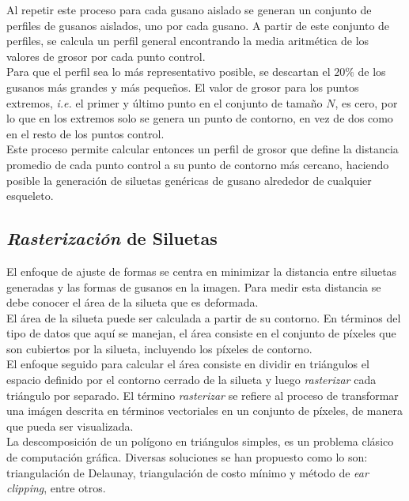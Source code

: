 Al repetir este proceso para cada gusano aislado se generan un conjunto de perfiles de gusanos
aislados, uno por cada gusano. A partir de este conjunto de perfiles, se calcula un perfil
general encontrando la media aritm\'etica de los valores de grosor por cada punto control.\\
Para que el perfil sea lo m\'as representativo posible, se descartan el $20\%$ de los gusanos
m\'as grandes y m\'as peque\~nos. El valor de grosor para los puntos extremos, \emph{i.e.} el
primer y \'ultimo punto en el conjunto de tama\~no $N$, es cero, por lo que en los extremos
solo se genera un punto de contorno, en vez de dos como en el resto de los puntos control.\\

Este proceso permite calcular entonces un perfil de grosor que define la distancia 
promedio de cada punto control a su punto de contorno m\'as cercano, haciendo posible
la generaci\'on de siluetas gen\'ericas de gusano alrededor de cualquier esqueleto.

\subsection{\emph{Rasterizaci\'on} de Siluetas}
\label{sec:metrast}

El enfoque de ajuste de formas se centra en minimizar la distancia entre siluetas
generadas y las formas de gusanos en la imagen. Para medir esta distancia se debe 
conocer el \'area de la silueta que es deformada.\\
El \'area de la silueta puede ser calculada a partir de su contorno. En t\'erminos
del tipo de datos que aqu\'i se manejan, el \'area consiste en el conjunto de p\'ixeles
que son cubiertos por la silueta, incluyendo los p\'ixeles de contorno.\\

El enfoque seguido para calcular el \'area consiste en dividir
en tri\'angulos el espacio definido por el contorno cerrado de la silueta y luego
\emph{rasterizar} cada tri\'angulo por separado. El t\'ermino \emph{rasterizar} se
refiere al proceso de transformar una im\'agen descrita en t\'erminos vectoriales
en un conjunto de p\'ixeles, de manera que pueda ser visualizada.\\

La descomposici\'on de un pol\'igono en tri\'angulos simples, es un problema
cl\'asico de computaci\'on gr\'afica. Diversas soluciones se han propuesto
como lo son: triangulaci\'on de Delaunay, triangulaci\'on de costo m\'inimo y
m\'etodo de \emph{ear clipping}, entre otros.
 
